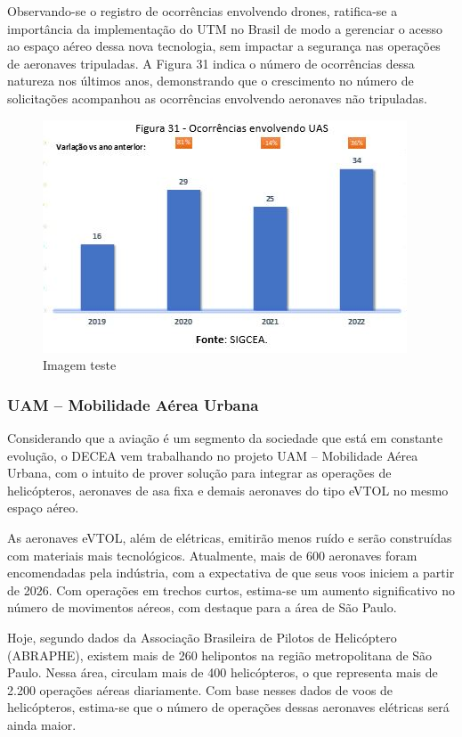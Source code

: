 \documentclass[
]{book}
\begin{document}
Observando-se o registro de ocorrências envolvendo drones, ratifica-se a importância da implementação do UTM no Brasil de modo a gerenciar o acesso ao espaço aéreo dessa nova tecnologia, sem impactar a segurança nas operações de aeronaves tripuladas. A Figura 31 indica o número de ocorrências dessa natureza nos últimos anos, demonstrando que o crescimento no número de solicitações acompanhou as ocorrências envolvendo aeronaves não tripuladas.

\begin{figure}
\centering
\includegraphics{imagens/fig35.jpg}
\caption{Imagem teste}
\end{figure}

\hypertarget{uam-mobilidade-auxe9rea-urbana}{%
\subsubsection{UAM -- Mobilidade Aérea Urbana}\label{uam-mobilidade-auxe9rea-urbana}}

Considerando que a aviação é um segmento da sociedade que está em constante evolução, o DECEA vem trabalhando no projeto UAM -- Mobilidade Aérea Urbana, com o intuito de prover solução para integrar as operações de helicópteros, aeronaves de asa fixa e demais aeronaves do tipo eVTOL no mesmo espaço aéreo.

As aeronaves eVTOL, além de elétricas, emitirão menos ruído e serão construídas com materiais mais tecnológicos. Atualmente, mais de 600 aeronaves foram encomendadas pela indústria, com a expectativa de que seus voos iniciem a partir de 2026. Com operações em trechos curtos, estima-se um aumento significativo no número de movimentos aéreos, com destaque para a área de São Paulo.

Hoje, segundo dados da Associação Brasileira de Pilotos de Helicóptero (ABRAPHE), existem mais de 260 helipontos na região metropolitana de São Paulo. Nessa área, circulam mais de 400 helicópteros, o que representa mais de 2.200 operações aéreas diariamente. Com base nesses dados de voos de helicópteros, estima-se que o número de operações dessas aeronaves elétricas será ainda maior.
\end{document}
